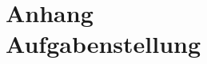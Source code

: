 \addtocounter{chapter}{1}
\chapter*{Anhang \thechapter\\[1.2cm] Aufgabenstellung}
\label{Aufgabenstellung}
%
\cleardoublepage